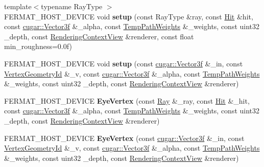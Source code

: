 \begin{DoxyCompactItemize}
\item 
\mbox{\label{struct_eye_vertex_a5788cce324807dd8bbc0f913ef3a777d}} 
{\footnotesize template$<$typename Ray\+Type $>$ }\\F\+E\+R\+M\+A\+T\+\_\+\+H\+O\+S\+T\+\_\+\+D\+E\+V\+I\+CE void {\bfseries setup} (const Ray\+Type \&ray, const \hyperlink{struct_hit}{Hit} \&hit, const \hyperlink{structcugar_1_1_vector}{cugar\+::\+Vector3f} \&\+\_\+alpha, const \hyperlink{struct_temp_path_weights}{Temp\+Path\+Weights} \&\+\_\+weights, const uint32 \+\_\+depth, const \hyperlink{struct_rendering_context_view}{Rendering\+Context\+View} \&renderer, const float min\+\_\+roughness=0.\+0f)
\item 
\mbox{\label{struct_eye_vertex_aa88f1c1bd1c6e1f8ae1f9df6f857f72f}} 
F\+E\+R\+M\+A\+T\+\_\+\+H\+O\+S\+T\+\_\+\+D\+E\+V\+I\+CE void {\bfseries setup} (const \hyperlink{structcugar_1_1_vector}{cugar\+::\+Vector3f} \&\+\_\+in, const \hyperlink{struct_vertex_geometry_id}{Vertex\+Geometry\+Id} \&\+\_\+v, const \hyperlink{structcugar_1_1_vector}{cugar\+::\+Vector3f} \&\+\_\+alpha, const \hyperlink{struct_temp_path_weights}{Temp\+Path\+Weights} \&\+\_\+weights, const uint32 \+\_\+depth, const \hyperlink{struct_rendering_context_view}{Rendering\+Context\+View} \&renderer)
\item 
\mbox{\label{struct_eye_vertex_a861d531288458ca4d465c2b93c65e1aa}} 
F\+E\+R\+M\+A\+T\+\_\+\+H\+O\+S\+T\+\_\+\+D\+E\+V\+I\+CE {\bfseries Eye\+Vertex} (const \hyperlink{struct_ray}{Ray} \&\+\_\+ray, const \hyperlink{struct_hit}{Hit} \&\+\_\+hit, const \hyperlink{structcugar_1_1_vector}{cugar\+::\+Vector3f} \&\+\_\+alpha, const \hyperlink{struct_temp_path_weights}{Temp\+Path\+Weights} \&\+\_\+weights, const uint32 \+\_\+depth, const \hyperlink{struct_rendering_context_view}{Rendering\+Context\+View} \&renderer)
\item 
\mbox{\label{struct_eye_vertex_a03db55c18029b0792be1843821f01d20}} 
F\+E\+R\+M\+A\+T\+\_\+\+H\+O\+S\+T\+\_\+\+D\+E\+V\+I\+CE {\bfseries Eye\+Vertex} (const \hyperlink{structcugar_1_1_vector}{cugar\+::\+Vector3f} \&\+\_\+in, const \hyperlink{struct_vertex_geometry_id}{Vertex\+Geometry\+Id} \&\+\_\+v, const \hyperlink{structcugar_1_1_vector}{cugar\+::\+Vector3f} \&\+\_\+alpha, const \hyperlink{struct_temp_path_weights}{Temp\+Path\+Weights} \&\+\_\+weights, const uint32 \+\_\+depth, const \hyperlink{struct_rendering_context_view}{Rendering\+Context\+View} \&renderer)

\end{DoxyCompactItemize}
